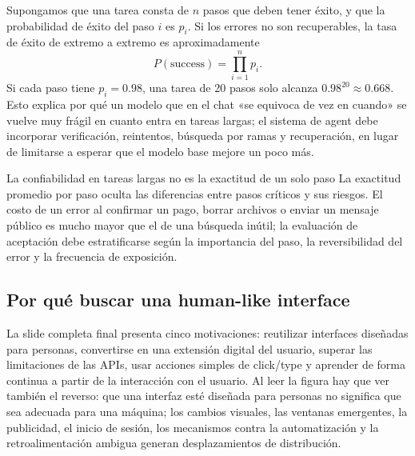 Supongamos que una tarea consta de $n$ pasos que deben tener éxito, y que la probabilidad de éxito del paso $i$ es $p_i$. Si los errores no son recuperables, la tasa de éxito de extremo a extremo es aproximadamente
\[
P(\text{success})=\prod_{i=1}^{n}p_i.
\]
Si cada paso tiene $p_i=0.98$, una tarea de 20 pasos solo alcanza $0.98^{20}\approx 0.668$. Esto explica por qué un modelo que en el chat «se equivoca de vez en cuando» se vuelve muy frágil en cuanto entra en tareas largas; el sistema de agent debe incorporar verificación, reintentos, búsqueda por ramas y recuperación, en lugar de limitarse a esperar que el modelo base mejore un poco más.

\begin{warningbox}{La confiabilidad en tareas largas no es la exactitud de un solo paso}
La exactitud promedio por paso oculta las diferencias entre pasos críticos y sus riesgos. El costo de un error al confirmar un pago, borrar archivos o enviar un mensaje público es mucho mayor que el de una búsqueda inútil; la evaluación de aceptación debe estratificarse según la importancia del paso, la reversibilidad del error y la frecuencia de exposición.
\end{warningbox}

\subsection{Por qué buscar una human-like interface}

La slide completa final presenta cinco motivaciones: reutilizar interfaces diseñadas para personas, convertirse en una extensión digital del usuario, superar las limitaciones de las APIs, usar acciones simples de click/type y aprender de forma continua a partir de la interacción con el usuario. Al leer la figura hay que ver también el reverso: que una interfaz esté diseñada para personas no significa que sea adecuada para una máquina; los cambios visuales, las ventanas emergentes, la publicidad, el inicio de sesión, los mecanismos contra la automatización y la retroalimentación ambigua generan desplazamientos de distribución.



